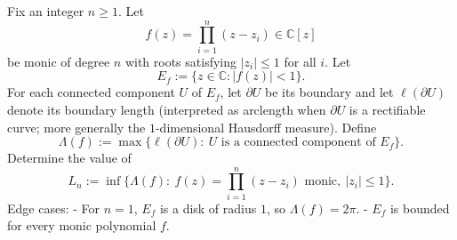 Fix an integer $n\ge 1$. Let
\[
  f(z)=\prod_{i=1}^n (z-z_i)\in\mathbb C[z]
\]
be monic of degree $n$ with roots satisfying $|z_i|\le 1$ for all $i$.
Let
\[
  E_f:=\{z\in\mathbb C: |f(z)|<1\}.
\]
For each connected component $U$ of $E_f$, let $\partial U$ be its boundary and let
$\ell(\partial U)$ denote its boundary length (interpreted as arclength when $\partial U$ is a
rectifiable curve; more generally the $1$-dimensional Hausdorff measure).
Define
\[
  \Lambda(f):=\max\{\ell(\partial U):\ U \text{ is a connected component of }E_f\}.
\]
Determine the value of
\[
  L_n:=\inf\{\Lambda(f):\ f(z)=\prod_{i=1}^n(z-z_i)\text{ monic},\ |z_i|\le 1\}.
\]
Edge cases:
- For $n=1$, $E_f$ is a disk of radius $1$, so $\Lambda(f)=2\pi$.
- $E_f$ is bounded for every monic polynomial $f$.
